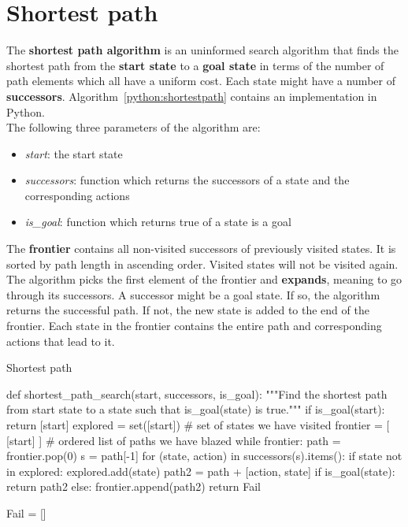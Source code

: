 \documentclass{report}
\begin{document}
\section{Shortest path}
The {\bf shortest path algorithm} is an uninformed search algorithm that finds the shortest path from the {\bf start state} to a {\bf goal state} in terms of the number of path elements which all have a uniform cost.
Each state might have a number of {\bf successors}. Algorithm~\ref{python:shortestpath} contains an implementation in Python.
\\
The following three parameters of the algorithm are:
\begin{itemize}
\item {\em start}: the start state
\item {\em successors}: function which returns the successors of a state and the corresponding actions
\item {\em is\_goal}: function which returns true of a state is a goal
\end{itemize}
The {\bf frontier} contains all non-visited successors of previously visited states. It is sorted by path length in ascending order. Visited states will not be visited again.
The algorithm picks the first element of the frontier and {\bf expands}, meaning to go through its successors.
A successor might be a goal state. If so, the algorithm returns the successful path.
If not, the new state is added to the end of the frontier.
Each state in the frontier contains the entire path and corresponding actions that lead to it.


\begin{algorithm}
\caption{Shortest path}
\label{python:shortestpath}
\begin{python}
def shortest_path_search(start, successors, is_goal):
    """Find the shortest path from start state to a state
    such that is_goal(state) is true."""
    if is_goal(start):
        return [start]
    explored = set([start]) # set of states we have visited
    frontier = [ [start] ] # ordered list of paths we have blazed
    while frontier:
        path = frontier.pop(0)
        s = path[-1]
        for (state, action) in successors(s).items():
            if state not in explored:
                explored.add(state)
                path2 = path + [action, state]
                if is_goal(state):
                    return path2
                else:
                    frontier.append(path2)
    return Fail

Fail = []
\end{python}
\end{algorithm}
\end{document}
